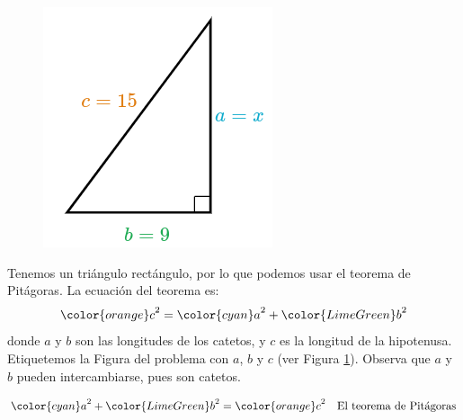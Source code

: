\begin{minipage}[t][][t]{0.6\textwidth}
    \begin{solutionbox}{9.5cm}
        \begin{minipage}{0.4\textwidth}
            \begin{figure}[H]
                \centering
                \includegraphics[width=0.95\linewidth]{../images/lados_pitagoras_41a.png}
                \caption{}
                \label{fig:lados_pitagoras_41a}
            \end{figure}
        \end{minipage}\hfill
        \begin{minipage}{0.55\textwidth}
            Tenemos un triángulo rectángulo, por lo que podemos usar el teorema de Pitágoras.
            La ecuación del teorema es:
            \[{\color{orange}c}^2={\color{cyan}a}^2+{\color{LimeGreen}b}^2\]
            donde $a$ y $b$ son las longitudes de los catetos, y $c$ es la longitud de la hipotenusa.
            Etiquetemos la Figura del problema con $a$, $b$ y $c$ (ver Figura \ref{fig:lados_pitagoras_41a}).
            Observa que $a$ y $b$ pueden intercambiarse, pues son catetos.
        \end{minipage}
        \begin{align*}
            {\color{cyan}a}^2+{\color{LimeGreen}b}^2  ={\color{orange}c}^2  & \text{\quad El teorema de Pitágoras}                          \\

\end{align*}
\end{solutionbox}
\end{minipage}
